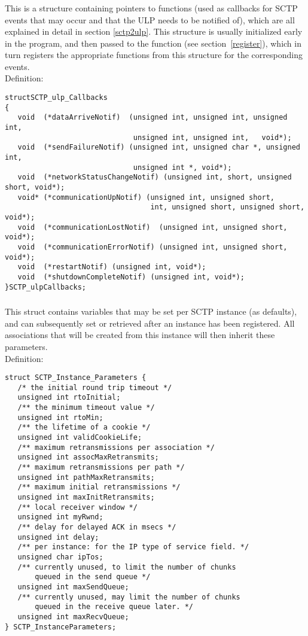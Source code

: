 \documentclass[10pt]{article}
\newcommand{\bv}{\vspace{0,1cm}\noindent \\ Definition:\footnotesize\begin{verbatim}}
\newcommand{\n}{\normalsize}
\begin{document}
\subsubsection{}
\label{callbacks}
This is a structure containing pointers to functions (used as callbacks for
SCTP events that may occur and that the ULP needs to be notified of), which are
all explained in detail in section \ref{sctp2ulp}.
This structure is usually initialized early in the program, and then passed
to the function  (see section~\ref{register}),
which in turn 
registers the appropriate functions from this structure for the corresponding 
events.
\bv
structSCTP_ulp_Callbacks
{
   void  (*dataArriveNotif)  (unsigned int, unsigned int, unsigned int,
                              unsigned int, unsigned int,   void*);
   void  (*sendFailureNotif) (unsigned int, unsigned char *, unsigned int,
                              unsigned int *, void*);
   void  (*networkStatusChangeNotif) (unsigned int, short, unsigned short, void*);
   void* (*communicationUpNotif) (unsigned int, unsigned short,
                                  int, unsigned short, unsigned short, void*);
   void  (*communicationLostNotif)  (unsigned int, unsigned short, void*);
   void  (*communicationErrorNotif) (unsigned int, unsigned short, void*);
   void  (*restartNotif) (unsigned int, void*);
   void  (*shutdownCompleteNotif) (unsigned int, void*);
}SCTP_ulpCallbacks;
\end{verbatim}\n


\subsubsection{}
\label{instance-params}
This struct contains variables that may be set per SCTP instance (as defaults),
and can subsequently set or retrieved after an instance has been registered.
All associations that will be created from this instance will then inherit
these parameters.
\bv
struct SCTP_Instance_Parameters {
   /* the initial round trip timeout */
   unsigned int rtoInitial;
   /** the minimum timeout value */
   unsigned int rtoMin;
   /** the lifetime of a cookie */
   unsigned int validCookieLife;
   /** maximum retransmissions per association */
   unsigned int assocMaxRetransmits;
   /** maximum retransmissions per path */
   unsigned int pathMaxRetransmits;
   /** maximum initial retransmissions */
   unsigned int maxInitRetransmits;
   /** local receiver window */
   unsigned int myRwnd;
   /** delay for delayed ACK in msecs */
   unsigned int delay;
   /** per instance: for the IP type of service field. */
   unsigned char ipTos;
   /** currently unused, to limit the number of chunks
       queued in the send queue */
   unsigned int maxSendQueue;
   /** currently unused, may limit the number of chunks
       queued in the receive queue later. */
   unsigned int maxRecvQueue;
} SCTP_InstanceParameters;
\end{verbatim}
\n
\end{document}
